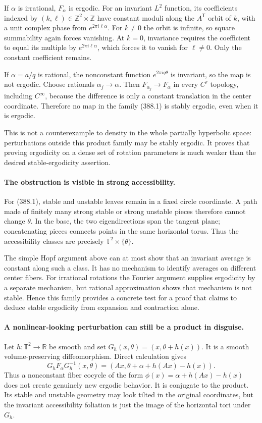 \documentclass[11pt]{article}
\begin{document}
If $\alpha$ is irrational, $F_\alpha$ is ergodic. For an invariant
$L^2$ function, its coefficients indexed by $(k,\ell)\in
\mathbb Z^2\times\mathbb Z$ have constant moduli along the
$A^{\mathsf T}$ orbit of $k$, with a unit complex phase from
$e^{2\pi i\ell\alpha}$. For $k\ne0$ the orbit is infinite,
so square summability again forces vanishing. At $k=0$, invariance
requires the coefficient to equal its multiple by
$e^{2\pi i\ell\alpha}$, which forces it to vanish for
$\ell\ne0$. Only the constant coefficient remains.

If $\alpha=a/q$ is rational, the nonconstant function
$e^{2\pi iq\theta}$ is invariant, so the map is not ergodic.
Choose rationals $\alpha_j\to\alpha$. Then
$F_{\alpha_j}\to F_\alpha$ in every $C^r$ topology, including
$C^\infty$, because the difference is only a constant translation
in the center coordinate. Therefore no map in the family (388.1)
is stably ergodic, even when it is ergodic.

This is not a counterexample to density in the whole partially
hyperbolic space: perturbations outside this product family may
be stably ergodic. It proves that proving ergodicity on a dense
set of rotation parameters is much weaker than the desired
stable-ergodicity assertion.

\paragraph{The obstruction is visible in strong accessibility.}
For (388.1), stable and unstable leaves remain in a fixed circle
coordinate. A path made of finitely many strong stable or strong
unstable pieces therefore cannot change $\theta$. In the base,
the two eigendirections span the tangent plane; concatenating
pieces connects points in the same horizontal torus. Thus the
accessibility classes are precisely
$\mathbb T^2\times\{\theta\}$.

The simple Hopf argument above can at most show that an invariant
average is constant along such a class. It has no mechanism to
identify averages on different center fibers. For irrational
rotations the Fourier argument supplies ergodicity by a separate
mechanism, but rational approximation shows that mechanism is
not stable. Hence this family provides a concrete test for a
proof that claims to deduce stable ergodicity from expansion and
contraction alone.

\paragraph{A nonlinear-looking perturbation can still be a product in disguise.}
Let $h:\mathbb T^2\to\mathbb R$ be smooth and set
$G_h(x,\theta)=(x,\theta+h(x))$. It is a smooth volume-preserving
diffeomorphism. Direct calculation gives
\[
 G_hF_\alpha G_h^{-1}(x,\theta)
      =(Ax,\theta+\alpha+h(Ax)-h(x)).
 \tag{388.2}
\]
Thus a nonconstant fiber cocycle of the form
$\phi(x)=\alpha+h(Ax)-h(x)$ does not create genuinely new
ergodic behavior. It is conjugate to the product. Its stable and
unstable geometry may look tilted in the original coordinates,
but the invariant accessibility foliation is just the image of
the horizontal tori under $G_h$.
\end{document}
